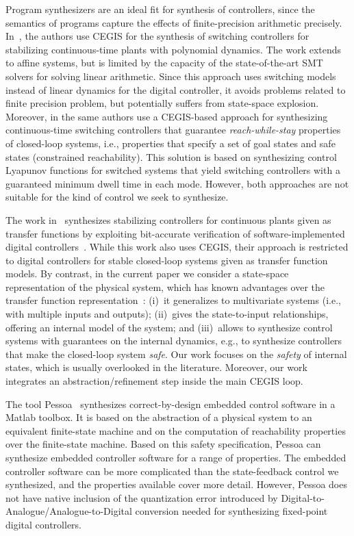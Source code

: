 \documentclass[runningheads,a4paper]{llncs}
\begin{document}
Program synthesizers are an ideal fit for synthesis of controllers, since
the semantics of programs capture the effects of finite-precision arithmetic
precisely.  In~\cite{DBLP:conf/cdc/RavanbakhshS15}, the authors use CEGIS
for the synthesis of switching controllers for stabilizing continuous-time
plants with polynomial dynamics.  The work extends to affine systems, but is
limited by the capacity of the state-of-the-art SMT solvers for solving
linear arithmetic.  Since this approach uses switching models instead of
linear dynamics for the digital controller, it avoids problems related to
finite precision problem, but potentially suffers from state-space
explosion.  Moreover, in \cite{DBLP:conf/emsoft/RavanbakhshS16} the same
authors use a CEGIS-based approach for synthesizing continuous-time
switching controllers that guarantee \emph{reach-while-stay} properties of
closed-loop systems, i.e., properties that specify a set of goal states and
safe states (constrained reachability).  This solution is based on
synthesizing control Lyapunov functions for switched systems that yield
switching controllers with a guaranteed minimum dwell time in each mode. 
However, both approaches are not suitable for the kind of control we seek to
synthesize.

The work in~\cite{hscc-paper} synthesizes stabilizing
controllers for continuous plants given as transfer functions by exploiting
bit-accurate verification of software-implemented digital
controllers~\cite{IsmailBCFF15, Bessa16}.  While this work also uses CEGIS,
their approach is restricted to digital controllers for stable closed-loop
systems given as transfer function models.  By contrast, in the current
paper we consider a state-space representation of the physical system, which
has known advantages over the transfer function
representation~\cite{Astrom08}: (i)~it generalizes to multivariate systems
(i.e., with multiple inputs and outputs); (ii)~gives the state-to-input
relationships, offering an internal model of the system; and (iii)~allows to
synthesize control systems with guarantees on the internal dynamics, e.g.,
to synthesize controllers that make the closed-loop system \emph{safe}.  Our
work focuses on the \emph{safety} of internal states, which is usually
overlooked in the literature.  Moreover, our work integrates an
abstraction/refinement step inside the main CEGIS loop.

The tool Pessoa~\cite{mazo2010pessoa} synthesizes correct-by-design embedded
control software in a Matlab toolbox.  It is based on the abstraction of a
physical system to an equivalent finite-state machine and on the computation
of reachability properties over the finite-state machine.  Based on this
safety specification, Pessoa can synthesize embedded controller software for
a range of properties.  The embedded controller software can be more
complicated than the state-feedback control we synthesized, and the
properties available cover more detail.
%
However, Pessoa does not have native inclusion of the quantization error
introduced by Digital-to-Analogue/Analogue-to-Digital conversion needed for
synthesizing fixed-point digital controllers.
\end{document}
